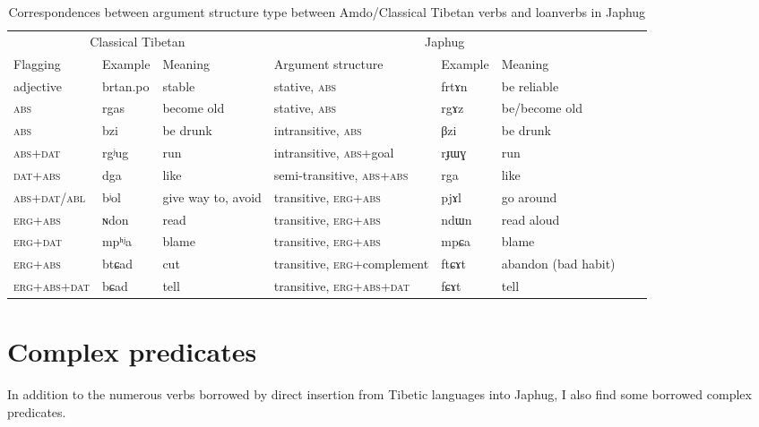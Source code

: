 \documentclass[oldfontcommands,oneside,a4paper,11pt]{article}
\newcommand{\ipa}[1]{{\phon \mbox{#1}}} %
\begin{document}
\begin{landscape}

 

\begin{table}[H]
\caption{Correspondences between argument structure type between Amdo/Classical Tibetan verbs and loanverbs in Japhug} \label{ex:correspondences}
\begin{tabular}{llllllll}
\toprule
 \multicolumn{3}{c}{Classical Tibetan}  & \multicolumn{3}{c}{Japhug}&&\\
Flagging & Example & Meaning & Argument structure & Example & Meaning & \\
\midrule
adjective & \ipa{brtan.po} &stable&  stative, \textsc{abs} & \ipa{frtɤn} &be reliable& \\
 \textsc{abs} &  \ipa{rgas} & become old &stative, \textsc{abs} & \ipa{rgɤz} & be/become old \\
 \textsc{abs} &  \ipa{bzi} & be drunk &intransitive, \textsc{abs} & \ipa{βzi} & be drunk \\
 \textsc{abs+dat} &  \ipa{rgʲug} &run &intransitive, \textsc{abs}+goal  & \ipa{rɟɯɣ} & run \\
\textsc{dat+abs} & \ipa{dga} & like & semi-transitive, \textsc{abs+abs}& \ipa{rga} & like \\
\midrule
 \textsc{abs+dat/abl} &  \ipa{bʲol} & give way to, avoid &transitive, \textsc{erg+abs}& \ipa{pjɤl} & go around \\
\textsc{erg+abs} & \ipa{ɴdon} & read & transitive, \textsc{erg+abs} & \ipa{ndɯn} & read aloud \\

\textsc{erg+dat} & \ipa{mpʰʲa} & blame & transitive, \textsc{erg+abs}& \ipa{mpɕa} & blame \\
\textsc{erg+abs} & \ipa{btɕad} & cut & transitive, \textsc{erg+}complement & \ipa{ftɕɤt} & abandon (bad habit) \\
\bottomrule
\textsc{erg+abs+dat} & \ipa{bɕad} & tell & transitive, \textsc{erg+abs+dat}& \ipa{fɕɤt} & tell \\
\bottomrule
\end{tabular}%
\end{table}  
\end{landscape}

  \section{Complex predicates}  
In addition to the numerous verbs borrowed by direct insertion from Tibetic languages into Japhug, I also find some borrowed complex predicates.
\end{document}
